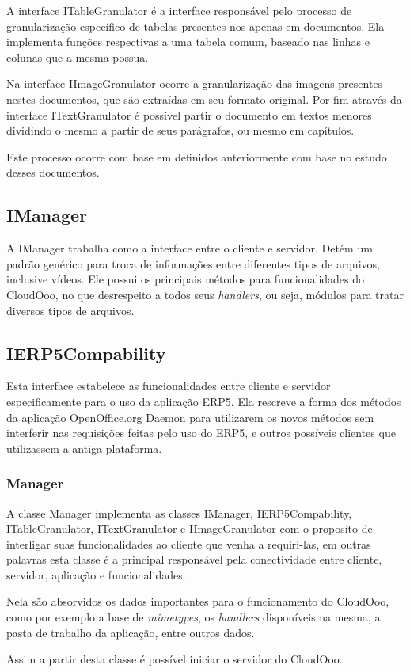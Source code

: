 A interface ITableGranulator é a interface responsável pelo processo de granularização específico de tabelas presentes nos apenas em documentos. Ela implementa funções respectivas a uma tabela comum, baseado nas linhas e colunas que a mesma possua.

Na interface IImageGranulator ocorre a granularização das imagens presentes nestes documentos, que são extraídas em seu formato original.
Por fim através da interface ITextGranulator é possível partir o documento em textos menores dividindo o mesmo a partir de seus parágrafos, ou mesmo em capítulos.

Este processo ocorre com base em  definidos anteriormente com base no estudo desses documentos.

\subsection{IManager}

A IManager trabalha como a interface entre o cliente e servidor. Detém um padrão genérico para troca de informações entre diferentes tipos de arquivos, inclusive vídeos. Ele possui os principais métodos para funcionalidades do CloudOoo, no que desrespeito a todos seus \textit{handlers}, ou seja, módulos para tratar diversos tipos de arquivos.

\subsection{IERP5Compability}

Esta interface estabelece as funcionalidades entre cliente e servidor especificamente para o uso da aplicação ERP5. Ela rescreve a forma dos métodos da aplicação OpenOffice.org Daemon para utilizarem os novos métodos sem interferir nas requisições feitas pelo uso do ERP5, e outros possíveis clientes que utilizassem a antiga plataforma.

\subsubsection{Manager}

A classe Manager implementa as classes IManager, IERP5Compability, ITableGranulator, ITextGranulator e IImageGranulator com o proposito de interligar suas funcionalidades ao cliente que venha a requiri-las, em outras palavras esta classe é a principal responsável pela conectividade entre cliente, servidor, aplicação e funcionalidades.

Nela são absorvidos os dados importantes para o funcionamento do CloudOoo, como por exemplo a base de \textit{mimetypes}, os \textit{handlers} disponíveis na mesma, a pasta de trabalho da aplicação, entre outros dados.

Assim a partir desta classe é possível iniciar o servidor do CloudOoo.
